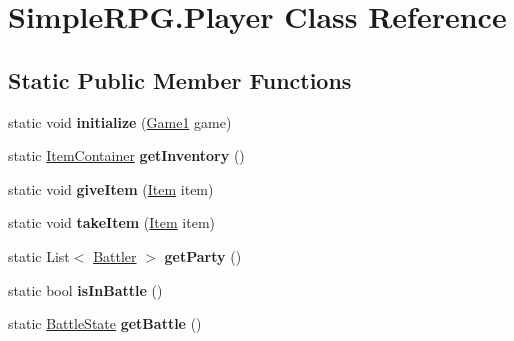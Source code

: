 \hypertarget{class_simple_r_p_g_1_1_player}{\section{Simple\-R\-P\-G.\-Player Class Reference}
\label{class_simple_r_p_g_1_1_player}
}
\subsection*{Static Public Member Functions}
\begin{DoxyCompactItemize}
\item 
\hypertarget{class_simple_r_p_g_1_1_player_a38d95df0139b80829f840295d580c861}{static void {\bfseries initialize} (\hyperlink{class_simple_r_p_g_1_1_game1}{Game1} game)}\label{class_simple_r_p_g_1_1_player_a38d95df0139b80829f840295d580c861}

\item 
\hypertarget{class_simple_r_p_g_1_1_player_a7b7f4514e3020e56a948316ef1fb5cc9}{static \hyperlink{class_simple_r_p_g_1_1_items_1_1_item_container}{Item\-Container} {\bfseries get\-Inventory} ()}\label{class_simple_r_p_g_1_1_player_a7b7f4514e3020e56a948316ef1fb5cc9}

\item 
\hypertarget{class_simple_r_p_g_1_1_player_ab5267292b513dc9b853f607dd34b1c38}{static void {\bfseries give\-Item} (\hyperlink{class_simple_r_p_g_1_1_items_1_1_item}{Item} item)}\label{class_simple_r_p_g_1_1_player_ab5267292b513dc9b853f607dd34b1c38}

\item 
\hypertarget{class_simple_r_p_g_1_1_player_a50294b9cd7ca33f530dce63e83b0acfe}{static void {\bfseries take\-Item} (\hyperlink{class_simple_r_p_g_1_1_items_1_1_item}{Item} item)}\label{class_simple_r_p_g_1_1_player_a50294b9cd7ca33f530dce63e83b0acfe}

\item 
\hypertarget{class_simple_r_p_g_1_1_player_a94a62653441c455e38a9572ccc6b8936}{static List$<$ \hyperlink{class_simple_r_p_g_1_1_battler}{Battler} $>$ {\bfseries get\-Party} ()}\label{class_simple_r_p_g_1_1_player_a94a62653441c455e38a9572ccc6b8936}

\item 
\hypertarget{class_simple_r_p_g_1_1_player_af6f5ca4c960bc0b8663c8f4ff5e0d28f}{static bool {\bfseries is\-In\-Battle} ()}\label{class_simple_r_p_g_1_1_player_af6f5ca4c960bc0b8663c8f4ff5e0d28f}

\item 
\hypertarget{class_simple_r_p_g_1_1_player_ab4e6aa85a07dff486b4db68a98372463}{static \hyperlink{class_simple_r_p_g_1_1_states_1_1_battle_state}{Battle\-State} {\bfseries get\-Battle} ()}\label{class_simple_r_p_g_1_1_player_ab4e6aa85a07dff486b4db68a98372463}


\end{DoxyCompactItemize}
